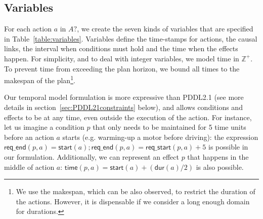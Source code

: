 \documentclass[runningheads]{llncs}
\newcommand{\dur}{\mathsf{dur}}    %
\newcommand{\start}{\mathsf{start}}%
\newcommand{\tim}{\mathsf{time}}   %
\newcommand{\reqs}{\mathsf{req\_{start}}} %
\newcommand{\reqe}{\mathsf{req\_{end}}}   %
\begin{document}


\subsection{Variables}


For each action $a$ in $A?$, we create the seven kinds of variables that are specified in Table~\ref{table:variables}. Variables define the time-stamps for actions, the causal links, the interval when conditions must hold and the time when the effects happen. For simplicity, and to deal with integer variables, we model time in $\mathbb{Z}^+$. To prevent time from exceeding the plan horizon, we bound all times to the makespan of the plan\footnote{We use the makespan, which can be also observed, to restrict the duration of the actions. However, it is dispensable if we consider a long enough domain for durations.}.


Our temporal model formulation is more expressive than PDDL2.1 (see more details in section~\ref{sec:PDDL21constraints} below), and allows conditions and effects to be at any time, even outside the execution of the action. For instance, let us imagine a condition $p$ that only needs to be maintained for 5 time units before an action $a$ starts (e.g. warming-up a motor before driving): the expression $\reqe(p,a)=\start(a); \reqe(p,a) = \reqs(p,a)+5$ is possible in our formulation. Additionally, we can represent an effect $p$ that happens in the middle of action $a$: $\tim(p,a) = \start(a)+ (\dur(a) / 2)$ is also possible.
\end{document}
